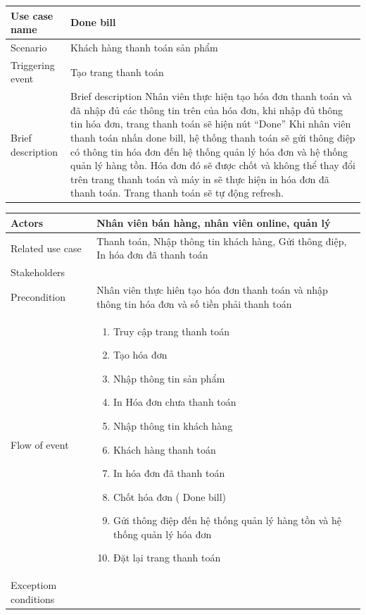 \documentclass{article}
\begin{document}
\begin{tabular}{|m{4cm}|m{12cm}|}
		\hline
		Use case name & Done bill\\
		\hline
		Scenario & Khách hàng thanh toán sản phẩm\\
		\hline
		Triggering event & Tạo trang thanh toán \\
		\hline
		Brief description & Brief description	Nhân viên thực hiện tạo hóa đơn thanh toán và đã nhập đủ các thông tin trên của hóa đơn, khi nhập đủ thông tin hóa đơn, trang thanh toán sẽ hiện nút “Done” 
Khi nhân viên thanh toán nhấn done bill, hệ thống thanh toán sẽ gửi thông điệp có thông tin hóa đơn đến hệ thống quản lý hóa đơn và hệ thống quản lý hàng tồn. Hóa đơn đó sẽ được chốt và không thể thay đổi trên trang thanh toán và máy in sẽ thực hiện in hóa đơn đã thanh toán. Trang thanh toán sẽ tự động refresh.\\
		\hline
		\end{tabular}
		\begin{tabular}{|m{4cm}|m{12cm}|}
        \hline
		 Actors & Nhân viên bán hàng, nhân viên online, quản lý\\
		\hline
		Related use case & Thanh toán, Nhập thông tin khách hàng, Gửi thông điệp, In hóa đơn đã thanh toán\\
		\hline
		Stakeholders & \\
		\hline
		Precondition & Nhân viên thực hiên tạo hóa đơn thanh toán và nhập thông tin hóa đơn và số tiền phải thanh toán\\
		\hline
		Flow of event & 
		\begin{enumerate}
			\item Truy cập trang thanh toán
			\item Tạo hóa đơn
			\item Nhập thông tin sản phẩm
			\item In Hóa đơn chưa thanh toán
			\item Nhập thông tin khách hàng
			\item Khách hàng thanh toán
			\item In hóa đơn đã thanh toán
			\item Chốt hóa đơn ( Done bill)
			\item Gửi thông điệp đến hệ thống quản lý hàng tồn và hệ thống quản lý hóa đơn
			\item Đặt lại trang thanh toán
        \end{enumerate}\\
	\hline
    Exceptiom conditions & \\
	\hline
\end{tabular}
\end{document}
